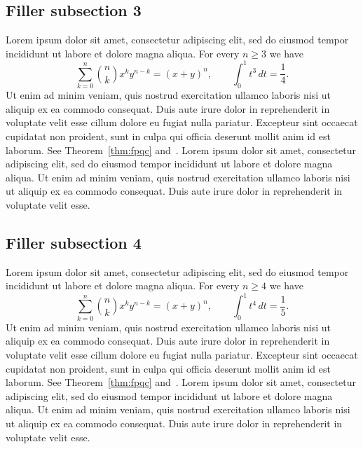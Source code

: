 \documentclass[11pt]{amsart}
\theoremstyle{definition}
\theoremstyle{remark}
\begin{document}
{\subsection{Filler subsection 3}
Lorem ipsum dolor sit amet, consectetur adipiscing elit, sed do eiusmod
tempor incididunt ut labore et dolore magna aliqua. For every $n\ge 3$ we have
\[
\sum_{k=0}^{n}\binom{n}{k}x^k y^{n-k}=(x+y)^n,\qquad
\int_0^1 t^{3}\,dt=\frac{1}{4}.
\]
Ut enim ad minim veniam, quis nostrud exercitation ullamco laboris nisi ut
aliquip ex ea commodo consequat. Duis aute irure dolor in reprehenderit in
voluptate velit esse cillum dolore eu fugiat nulla pariatur. Excepteur sint
occaecat cupidatat non proident, sunt in culpa qui officia deserunt mollit
anim id est laborum. See Theorem~\ref{thm:fpqc} and~\cite{Vistoli}.
Lorem ipsum dolor sit amet, consectetur adipiscing elit, sed do eiusmod
tempor incididunt ut labore et dolore magna aliqua. Ut enim ad minim veniam,
quis nostrud exercitation ullamco laboris nisi ut aliquip ex ea commodo
consequat. Duis aute irure dolor in reprehenderit in voluptate velit esse.

\subsection{Filler subsection 4}
Lorem ipsum dolor sit amet, consectetur adipiscing elit, sed do eiusmod
tempor incididunt ut labore et dolore magna aliqua. For every $n\ge 4$ we have
\[
\sum_{k=0}^{n}\binom{n}{k}x^k y^{n-k}=(x+y)^n,\qquad
\int_0^1 t^{4}\,dt=\frac{1}{5}.
\]
Ut enim ad minim veniam, quis nostrud exercitation ullamco laboris nisi ut
aliquip ex ea commodo consequat. Duis aute irure dolor in reprehenderit in
voluptate velit esse cillum dolore eu fugiat nulla pariatur. Excepteur sint
occaecat cupidatat non proident, sunt in culpa qui officia deserunt mollit
anim id est laborum. See Theorem~\ref{thm:fpqc} and~\cite{Vistoli}.
Lorem ipsum dolor sit amet, consectetur adipiscing elit, sed do eiusmod
tempor incididunt ut labore et dolore magna aliqua. Ut enim ad minim veniam,
quis nostrud exercitation ullamco laboris nisi ut aliquip ex ea commodo
consequat. Duis aute irure dolor in reprehenderit in voluptate velit esse.

}
\end{document}
